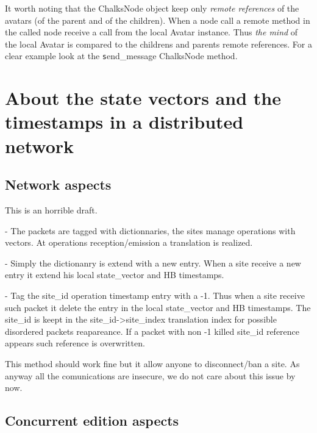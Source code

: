 \documentclass{report}
\begin{document}
It worth noting that the ChalksNode object keep only \emph{remote references} of the avatars (of the parent and of the children). When a node call a remote method in the called node receive a call from the local Avatar instance. Thus \emph{the mind} of the local Avatar is compared to the childrens and parents remote references. For a clear example look at the {\texttt send\_message} ChalksNode method.

\section{About the state vectors and the timestamps in a distributed network}




\subsection{Network aspects}

This is an horrible draft.

- The packets are tagged with dictionnaries, the sites manage operations with vectors. At operations reception/emission a translation is realized.


- Simply the dictionanry is extend with a new entry. When a site receive a new entry it extend his local state\_vector and HB timestamps.


- Tag the site\_id operation timestamp entry with a -1. Thus when a site receive such packet it delete the entry in the local state\_vector and HB timestamps. The site\_id is keept in the site_id->site\_index translation index for possible disordered packets reapareance. If a packet with non -1 killed site\_id reference appears such reference is overwritten.

This method should work fine but it allow anyone to disconnect/ban a site. As anyway all the comunications are insecure, we do not care about this issue by now.

\subsection{Concurrent edition aspects}
\end{document}
